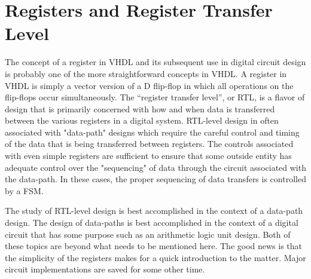 %
%
\chapter{Registers and Register Transfer Level}
The concept of a register in VHDL and its subsequent use in digital circuit design is probably one of the more straightforward concepts in VHDL. A register in VHDL is simply a vector version of a D flip-flop in which all operations on the flip-flops occur simultaneously. The ``register transfer level'', or RTL, is a flavor of design that is primarily concerned with how and when data is transferred between the various registers in a digital system. RTL-level design in often associated with "data-path" designs which require the careful control and timing of the data that is being transferred between registers. The controls associated with even simple registers are sufficient to ensure that some outside entity has adequate control over the "sequencing" of data through the circuit associated with the data-path. In these cases, the proper sequencing of data transfers is controlled by a FSM. 

The study of RTL-level design is best accomplished in the context of a data-path design. The design of data-paths is best accomplished in the context of a digital circuit that has some purpose such as an arithmetic logic unit design. Both of these topics are beyond what needs to be mentioned here. The good news is that the simplicity of the registers makes for a quick introduction to the matter. Major circuit implementations are saved for some other time.

